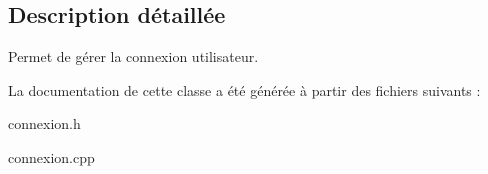 \subsection{Description détaillée}
Permet de gérer la connexion utilisateur. 

La documentation de cette classe a été générée à partir des fichiers suivants \+:\begin{DoxyCompactItemize}
\item 
connexion.\+h\item 
connexion.\+cpp\end{DoxyCompactItemize}
